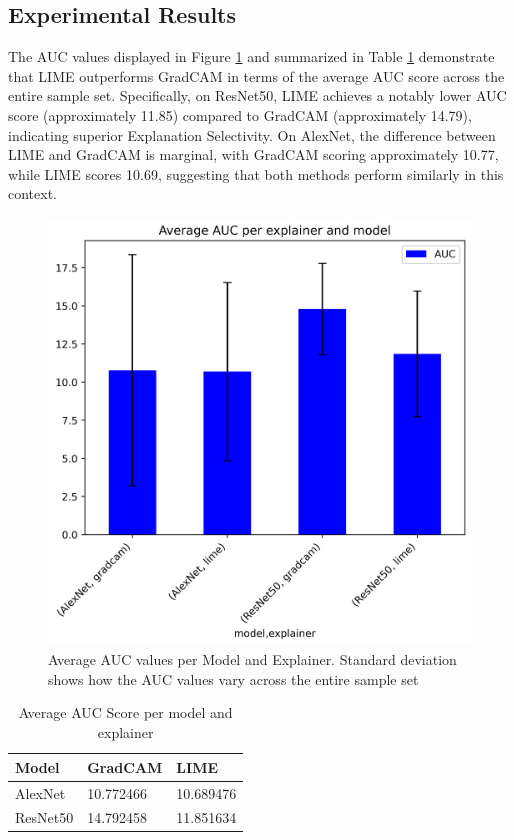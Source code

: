 \documentclass{article}
\begin{document}

\subsection{Experimental Results}
The AUC values displayed in Figure \ref{fig:average-auc-per-exp-and-model-plus-std-dev} and summarized in Table \ref{tab:plain} demonstrate that LIME outperforms GradCAM in terms of the average AUC score across the entire sample set. Specifically, on ResNet50, LIME achieves a notably lower AUC score (approximately 11.85) compared to GradCAM (approximately 14.79), indicating superior Explanation Selectivity. On AlexNet, the difference between LIME and GradCAM is marginal, with GradCAM scoring approximately 10.77, while LIME scores 10.69, suggesting that both methods perform similarly in this context.

\begin{figure}
    \centering
    \includegraphics[width=.8\linewidth]{results/average-auc-per-exp-and-model-plus-std-dev.png}
    \caption{Average AUC values per Model and Explainer. Standard deviation shows how the AUC values vary across the entire sample set}
    \label{fig:average-auc-per-exp-and-model-plus-std-dev}
\end{figure}



\begin{table}
    \centering
    \begin{tabular}{lll}
        \hline
        Model       & GradCAM      & LIME \\
        \hline
        AlexNet     & 10.772466    & 10.689476 \\
        ResNet50    & 14.792458    & 11.851634 \\
        \hline
    \end{tabular}
    \caption{Average AUC Score per model and explainer}
    \label{tab:plain}
\end{table}
\end{document}
